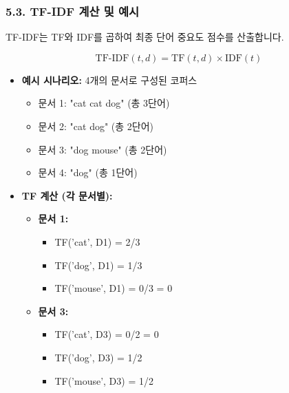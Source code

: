 \documentclass[11pt,a4paper]{article}
\theoremstyle{definition}
\begin{document}
\subsubsection{5.3. TF-IDF 계산 및 예시}
TF-IDF는 TF와 IDF를 곱하여 최종 단어 중요도 점수를 산출합니다.

\begin{tcolorbox}[summarybox, title=TF-IDF 계산]
$$ \text{TF-IDF}(t, d) = \text{TF}(t, d) \times \text{IDF}(t) $$
\end{tcolorbox}

\begin{itemize}
    \item \textbf{예시 시나리오:} 4개의 문서로 구성된 코퍼스
    \begin{itemize}
        \item 문서 1: "cat cat dog" (총 3단어)
        \item 문서 2: "cat dog" (총 2단어)
        \item 문서 3: "dog mouse" (총 2단어)
        \item 문서 4: "dog" (총 1단어)
    \end{itemize}

    \item \textbf{TF 계산 (각 문서별):}
    \begin{itemize}
        \item \textbf{문서 1:}
            \begin{itemize}
                \item TF('cat', D1) = 2/3
                \item TF('dog', D1) = 1/3
                \item TF('mouse', D1) = 0/3 = 0
            \end{itemize}
        \item \textbf{문서 3:}
            \begin{itemize}
                \item TF('cat', D3) = 0/2 = 0
                \item TF('dog', D3) = 1/2
                \item TF('mouse', D3) = 1/2
            \end{itemize}
    \end{itemize}


\end{itemize}
\end{document}
